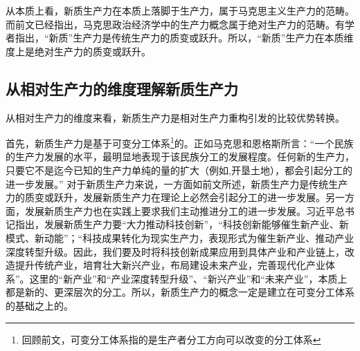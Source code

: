 从本质上看，新质生产力在本质上落脚于生产力\cite[138]{ZhangLinXinZhiShengChanLiDeNeiHanTeZhengLiLunChuangXinYuJieZhiYiYun2023}，属于马克思主义生产力的范畴\cite[7]{RenBaoPingXinZhiShengChanLiWenXianZongShuYuYanJiuZhanWang2024}\cite[2-4]{ZhouWenLunXinZhiShengChanLiNeiHanTeZhengYuChongYaoZhaoLiDian2023}\cite[129]{GaoFanXinZhiShengChanLiDeTiChuLuoJiDuoWeiNeiHanJiShiDaiYiYi2023}\cite[1-2]{PuQingPingXiJinPingZongShuJiGuanYuXinZhiShengChanLiChongYaoLunShuDeShengChengLuoJiLiLunChuangXinYuShiDaiJieZhi2023}\cite[15-16]{RenBaoPingShengChanLiXianDaiHuaZhuanXingXingChengXinZhiShengChanLiDeLuoJi2024}。而前文已经指出，马克思政治经济学中的生产力概念属于绝对生产力的范畴。有学者指出，“新质”生产力是传统生产力的质变或跃升\cite[3]{ZhouWenLunXinZhiShengChanLiNeiHanTeZhengYuChongYaoZhaoLiDian2023}\cite[143]{ZhangLinXinZhiShengChanLiDeNeiHanTeZhengLiLunChuangXinYuJieZhiYiYun2023}\cite[52]{XuZhengXinZhiShengChanLiFuNengGaoZhiLiangFaZhanDeNeiZaiLuoJiYuShiJianGouXiang2023}\cite[2]{PuQingPingXiJinPingZongShuJiGuanYuXinZhiShengChanLiChongYaoLunShuDeShengChengLuoJiLiLunChuangXinYuShiDaiJieZhi2023}\cite[13]{RenBaoPingShengChanLiXianDaiHuaZhuanXingXingChengXinZhiShengChanLiDeLuoJi2024}\cite[6]{RenBaoPingXinZhiShengChanLiWenXianZongShuYuYanJiuZhanWang2024}。所以，“新质”生产力在本质维度上是绝对生产力的质变或跃升。

\subsection{从相对生产力的维度理解新质生产力}

从相对生产力的维度来看，新质生产力是相对生产力重构引发的比较优势转换。

首先，新质生产力是基于可变分工体系\footnote{回顾前文，可变分工体系指的是生产者分工方向可以改变的分工体系}的。正如马克思和恩格斯所言：“一个民族的生产力发展的水平，最明显地表现于该民族分工的发展程度。任何新的生产力，只要它不是迄今已知的生产力单纯的量的扩大（例如,开垦土地），都会引起分工的进一步发展。” \cite[520]{ZhongGongZhongYangMaKeSiEnGeSiLieNingSiDaLinZhuZuoBianYiJuMaKeSiEnGeSiWenJiDi1Juan2009}对于新质生产力来说，一方面如前文所述，新质生产力是传统生产力的质变或跃升，发展新质生产力在理论上必然会引起分工的进一步发展\cite[141]{ZhangLinXinZhiShengChanLiDeNeiHanTeZhengLiLunChuangXinYuJieZhiYiYun2023}。另一方面，发展新质生产力也在实践上要求我们主动推进分工的进一步发展。习近平总书记指出，发展新质生产力要“大力推动科技创新”，“科技创新能够催生新产业、新模式、新动能”\cite[516]{XiJinPingXiJinPingJingJiWenXuanDiYiJuan2025}；“科技成果转化为现实生产力，表现形式为催生新产业、推动产业深度转型升级。因此，我们要及时将科技创新成果应用到具体产业和产业链上，改造提升传统产业，培育壮大新兴产业，布局建设未来产业，完善现代化产业体系”。\cite[516]{XiJinPingXiJinPingJingJiWenXuanDiYiJuan2025}这里的“新产业”和“产业深度转型升级”、“新兴产业”和“未来产业”，本质上都是新的、更深层次的分工。所以，新质生产力的概念一定是建立在可变分工体系的基础之上的。

